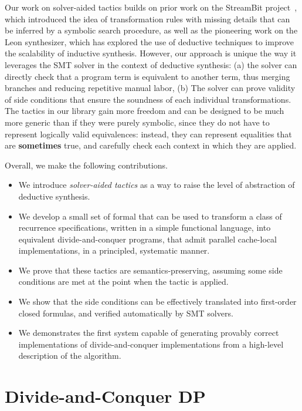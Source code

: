 Our work on solver-aided tactics builds on prior work on the StreamBit project~\cite{PLDI05/Solar-Lezama}, which introduced the idea of transformation rules with missing details that can be inferred by a symbolic search procedure, as well as the pioneering work on the Leon synthesizer, which has explored the use of deductive techniques to improve the scalability of inductive synthesis. However, our approach is unique the way it leverages the SMT solver in the context of deductive synthesis: (a) the solver can directly check that a program term is equivalent to another term, thus merging branches and reducing repetitive manual labor, (b) The solver can prove validity of side conditions that ensure the soundness of each individual transformations. The tactics in our library gain more freedom and can be designed to be much more generic than if they were purely symbolic, since they do not have to represent logically valid equivalences: instead, they can represent equalities that are {\bf sometimes} true, and carefully check each context in which they are applied. 

Overall, we make the following contributions.
\begin{itemize}
\item We introduce \emph{solver-aided tactics} as a way to raise the level of abstraction of deductive synthesis.
\item We develop a small set of formal  that can be used to transform a class of recurrence
  specifications, written in a simple functional language, 
  into equivalent divide-and-conquer programs, that admit parallel cache-local
  implementations, in a principled, systematic manner.
\item We prove that these tactics are semantics-preserving, assuming some side conditions are met
  at the point when the tactic is applied.
  \item We show that the side conditions can be effectively translated into first-order closed
  formulas, and verified automatically by SMT solvers.
\item We demonstrates the first system capable of generating provably correct implementations of divide-and-conquer implementations from a high-level description of the algorithm. 
\end{itemize} 

\section{Divide-and-Conquer DP}
\label{divide}

